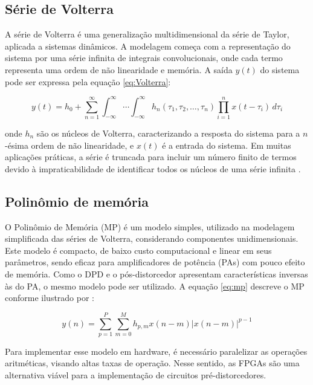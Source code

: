 \subsection{Série de Volterra}
A série de Volterra é uma generalização multidimensional da série de Taylor, aplicada a sistemas dinâmicos. A modelagem começa com a representação do sistema por uma série infinita de integrais convolucionais, onde cada termo representa uma ordem de não linearidade e memória. A saída \( y(t) \) do sistema pode ser expressa pela equação \ref{eq:Volterra}:

\[
y(t) = h_0 + \sum_{n=1}^{\infty} \int_{-\infty}^{\infty} \cdots \int_{-\infty}^{\infty} h_n(\tau_1, \tau_2, \ldots, \tau_n) \prod_{i=1}^{n} x(t - \tau_i) \, d\tau_i
\label{eq:Volterra}
\]

onde \( h_n \) são os núcleos de Volterra, caracterizando a resposta do sistema para a \( n \)-ésima ordem de não linearidade, e \( x(t) \) é a entrada do sistema. Em muitas aplicações práticas, a série é truncada para incluir um número finito de termos devido à impraticabilidade de identificar todos os núcleos de uma série infinita \cite{Gonçalves2009}.
\subsection{Polinômio de memória}
O Polinômio de Memória (MP) é um modelo simples, utilizado na modelagem simplificada das séries de Volterra, considerando componentes unidimensionais. Este modelo é compacto, de baixo custo computacional e linear em seus parâmetros, sendo eficaz para amplificadores de potência (PAs) com pouco efeito de memória. Como o DPD e o pós-distorcedor apresentam características inversas às do PA, o mesmo modelo pode ser utilizado. A equação \ref{eq:mp} descreve o MP conforme ilustrado por \cite{Schuartz2017}:

\[
y(n) = \sum_{p=1}^{P} \sum_{m=0}^{M} h_{p,m} x(n - m) \left| x(n - m) \right|^{p-1}
\label{eq:mp}
\]

Para implementar esse modelo em hardware, é necessário paralelizar as operações aritméticas, visando altas taxas de operação. Nesse sentido, as FPGAs são uma alternativa viável para a implementação de circuitos pré-distorcedores.